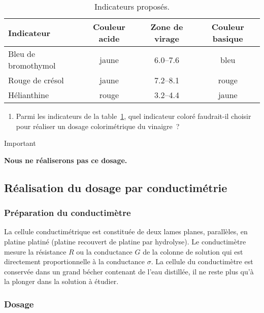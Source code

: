 \documentclass[a4paper, 10pt, final, garamond]{book}
\begin{document}
\begin{table}[h!]
    \centering
    \caption{Indicateurs proposés.}
    \label{tab:ind}
    \begin{tabular}{lccc}
        \toprule
        Indicateur & Couleur acide & Zone de virage & Couleur basique
        \\\midrule
        Bleu de bromothymol & jaune & \SIrange{6.0}{7.6}{} & bleu
        \\
        Rouge de crésol & jaune & \SIrange{7.2}{8.1}{} & rouge
        \\
        Hélianthine & rouge & \SIrange{3.2}{4.4}{} & jaune
        \\\bottomrule
    \end{tabular}
\end{table}

\begin{enumerate}[label=\sqenumi, resume]
    \item Parmi les indicateurs de la table~\ref{tab:ind}, quel indicateur
        coloré faudrait-il choisir pour réaliser un dosage colorimétrique du
        vinaigre~? 
\end{enumerate}

\begin{bror}{Important}
    \begin{center}
        \bfseries
        Nous ne réaliserons pas ce dosage.
    \end{center}
\end{bror}

\subsection{Réalisation du dosage par conductimétrie}
\subsubsection{Préparation du conductimètre}

La cellule conductimétrique est constituée de deux lames planes, parallèles, en
platine platiné (platine recouvert de platine par hydrolyse). Le conductimètre
mesure la résistance $R$ ou la conductance $G$ de la colonne de solution qui est
directement proportionnelle à la conductance $\sigma$. La cellule du
conductimètre est conservée dans un grand bécher contenant de l'eau distillée,
il ne reste plus qu'à la plonger dans la solution à étudier. 

\subsubsection{Dosage}
\end{document}
